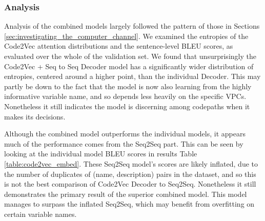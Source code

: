 \subsubsection{Analysis} %


Analysis of the combined models largely followed the pattern of those in Sections \ref{sec:investigating_the_computer_channel}. We examined the entropies of the Code2Vec attention distributions and the sentence-level BLEU scores, as evaluated over the whole of the validation set.
We found that unsurprisingly the Code2Vec + Seq to Seq Decoder model has a significantly wider distribution of entropies, centered around a higher point, than the individual Decoder. 
This may partly be down to the fact that the model is now also learning from the highly informative variable name, and so depends less heavily on the specific VPCs. Nonetheless it still indicates the model is discerning among codepaths when it makes its decisions.

Although the combined model outperforms the individual models, it appears much of the performance comes from the Seq2Seq part. This can be seen by looking at the individual model BLEU scores in results Table \ref{table:code2vec_embed}. 
These Seq2Seq model's scores are likely inflated, due to the number of duplicates of (name, description) pairs in the dataset, and so this is not the best comparison of Code2Vec Decoder to Seq2Seq.
Nonetheless it still demonstrates the primary result of the superior combined model. This model manages to surpass the inflated Seq2Seq, which may benefit from overfitting on certain variable names.





